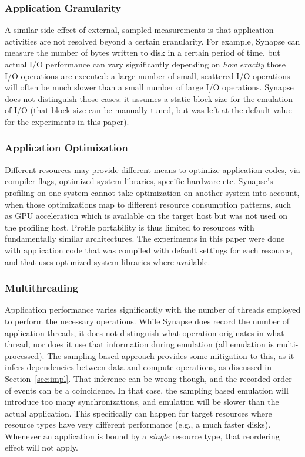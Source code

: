 \documentclass[10pt, conference, compsocconf]{IEEEtran}
\newcommand{\I}[1]{\textit{#1}\xspace}
\newcommand{\synapse}{Synapse\xspace}
\begin{document}
 \subsubsection{Application Granularity}  A similar side effect of
 external, sampled measurements is that application activities are not
 resolved beyond a certain granularity.  For example, \synapse can
 measure the number of bytes written to disk in a certain period of
 time, but actual I/O performance can vary significantly depending on
 \I{how exactly} those I/O operations are executed: a large number of
 small, scattered I/O operations will often be much slower than a
 small number of large I/O operations.  \synapse does not distinguish
 those cases: it assumes a static block size for the emulation of
 I/O (that block size can be manually tuned, but was left at the
 default value for the experiments in this paper).

 \subsubsection{Application Optimization}  Different resources may
 provide different means to optimize application codes, via compiler
 flags, optimized system libraries, specific hardware etc.  \synapse's profiling on one
 system cannot take optimization on another system into account, when
 those optimizations map to different resource consumption patterns,
 such as GPU acceleration which is available on the target host but
 was not used on the profiling host.  Profile portability is thus
 limited to resources with fundamentally similar architectures.
 The experiments in this paper were done with application code that
 was compiled with default settings for each resource, and that uses
 optimized system libraries where available.

 \subsubsection{Multithreading}  Application performance varies
 significantly with the number of threads employed to perform the
 necessary operations.  While \synapse does record the number of
 application threads, it does not distinguish what operation
 originates in what thread, nor does it use that information during
 emulation (all emulation is multi-processed).  The sampling based
 approach provides some mitigation to this, as it infers dependencies
 between data and compute operations, as discussed in
 Section~\ref{sec:impl}.  That inference can be wrong though, and the
 recorded order of events can be a coincidence.  In that case, the
 sampling based emulation will introduce too many synchronizations,
 and emulation will be slower than the actual application.  This specifically can
  happen for target resources where resource types have
 very different performance (e.g., a much faster disks).  Whenever an
 application is bound by a \I{single} resource type, that
 reordering effect will not apply.
\end{document}
